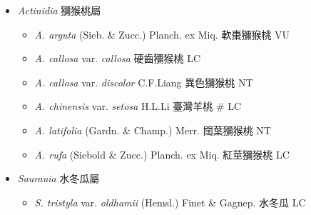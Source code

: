 
  \begin{itemize}
 \item[] \textit{Actinidia} 獼猴桃屬
                                
  \begin{itemize}
        \item[] \textit{A. arguta} (Sieb. \& Zucc.) Planch. ex Miq.  軟棗獼猴桃   VU
        \item[] \textit{A. callosa} var. \textit{callosa}   硬齒獼猴桃   LC
        \item[] \textit{A. callosa} var. \textit{discolor} C.F.Liang  異色獼猴桃   NT
        \item[] \textit{A. chinensis} var. \textit{setosa} H.L.Li  臺灣羊桃  \# LC
        \item[] \textit{A. latifolia} (Gardn. \& Champ.) Merr.  闊葉獼猴桃   NT
        \item[] \textit{A. rufa} (Siebold \& Zucc.) Planch. ex Miq.  紅莖獼猴桃   LC
  \end{itemize}
 \item[] \textit{Saurauia} 水冬瓜屬
                                
  \begin{itemize}
        \item[] \textit{S. tristyla} var. \textit{oldhamii} (Hemsl.) Finet \& Gagnep.  水冬瓜   LC
  \end{itemize}
  \end{itemize}
